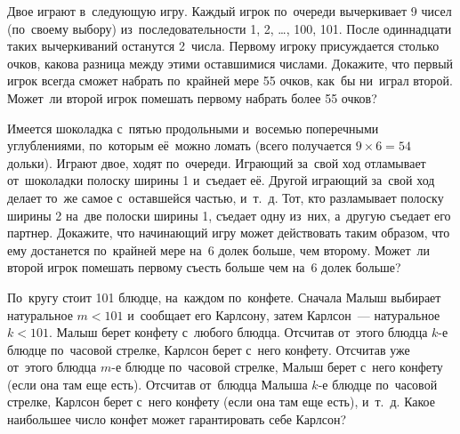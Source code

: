 \begin{problems}

\item
Двое играют в~следующую игру.
Каждый игрок по~очереди вычеркивает 9 чисел (по~своему выбору)
из~последовательности 1, 2, \ldots, 100, 101.
После одиннадцати таких вычеркиваний останутся 2~числа.
Первому игроку присуждается столько очков, какова разница между этими
оставшимися числами.
Докажите, что первый игрок всегда сможет набрать по~крайней мере 55 очков,
как~бы ни~играл второй.
Может~ли второй игрок помешать первому набрать более 55 очков?

\item
Имеется шоколадка с~пятью продольными и~восемью поперечными углублениями,
по~которым её~можно ломать (всего получается $9 \times 6 = 54$ дольки).
Играют двое, ходят по~очереди.
Играющий за~свой ход отламывает от~шоколадки полоску ширины 1 и~съедает её.
Другой играющий за~свой ход делает то~же самое с~оставшейся частью, и~т.~д.
Тот, кто разламывает полоску ширины 2 на~две полоски ширины 1, съедает одну
из~них, а~другую съедает его партнер.
Докажите, что начинающий игру может действовать таким образом, что ему
достанется по~крайней мере на~6 долек больше, чем второму.
Может~ли второй игрок помешать первому съесть больше чем на~6 долек больше?

\item
По~кругу стоит 101 блюдце, на~каждом по~конфете.
Сначала Малыш выбирает натуральное $m < 101$ и~сообщает его Карлсону, затем
Карлсон~--- натуральное $k < 101$.
Малыш берет конфету с~любого блюдца.
Отсчитав от~этого блюдца $k$-е блюдце по~часовой стрелке, Карлсон берет с~него
конфету.
Отсчитав уже от~этого блюдца $m$-е блюдце по~часовой стрелке, Малыш берет
с~него конфету (если она там еще есть).
Отсчитав от~блюдца Малыша $k$-е блюдце по~часовой стрелке, Карлсон берет с~него
конфету (если она там еще есть), и~т.~д.
Какое наибольшее число конфет может гарантировать себе Карлсон?

\end{problems}

